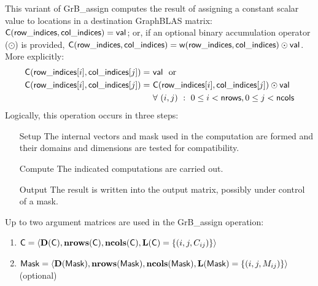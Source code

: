 This variant of {\sf GrB\_assign} computes the result of assigning a constant
scalar value to locations in a destination GraphBLAS matrix: 
${\sf C}({\sf row\_indices, col\_indices}) = {\sf val}$; or, if an optional 
binary accumulation operator ($\odot$) is provided, 
${\sf C}({\sf row\_indices, col\_indices}) = 
{\sf w}({\sf row\_indices, col\_indices}) \odot {\sf val}$.  
More explicitly:
\[
\begin{aligned}
	{\sf C}({\sf row\_indices}[i], {\sf col\_indices}[j]) =\ & {\sf val} \mbox{~~or~~} \\
    {\sf C}({\sf row\_indices}[i], {\sf col\_indices}[j]) =\ & 
              {\sf C}({\sf row\_indices}[i], {\sf col\_indices}[j]) \odot {\sf val} \\
    & \forall \ (i,j) \ : \ 0 \leq i < {\sf nrows},  0 \leq j < {\sf ncols}
\end{aligned}
\]  
Logically, this operation occurs in three steps:
\begin{enumerate}[leftmargin=0.75in]
\item[Setup] The internal vectors and mask used in the computation are formed 
and their domains and dimensions are tested for compatibility.
\item[Compute] The indicated computations are carried out.
\item[Output] The result is written into the output matrix, possibly under 
control of a mask.
\end{enumerate}

Up to two argument matrices are used in the {\sf GrB\_assign} operation:
\begin{enumerate}
	\item ${\sf C} = \langle \bold{D}({\sf C}),\bold{nrows}({\sf C}),
    \bold{ncols}({\sf C}),\bold{L}({\sf C}) = \{(i,j,C_{ij}) \} \rangle$
    
	\item ${\sf Mask} = \langle \bold{D}({\sf Mask}),\bold{nrows}({\sf Mask}),
    \bold{ncols}({\sf Mask}),\bold{L}({\sf Mask}) = \{(i,j,M_{ij}) \} \rangle$ (optional)
\end{enumerate}

